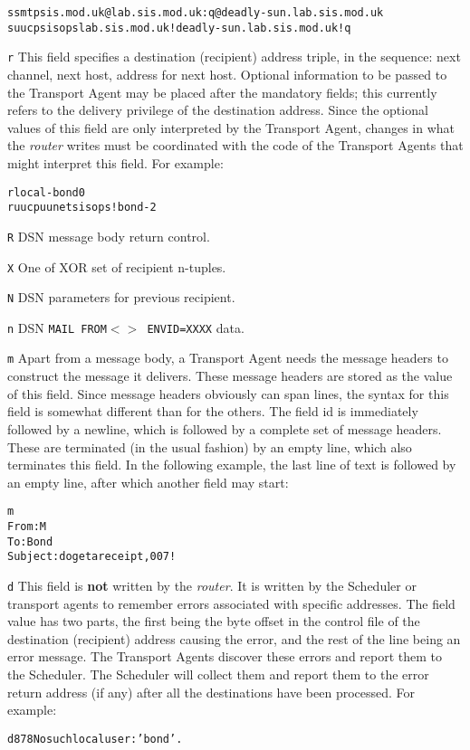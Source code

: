 \begin{alltt}
          s smtp sis.mod.uk @lab.sis.mod.uk:q@deadly-sun.lab.sis.mod.uk
          s uucp sisops lab.sis.mod.uk!deadly-sun.lab.sis.mod.uk!q
\end{alltt}


{\tt r}     
This field specifies a destination (recipient) address triple, in the
sequence: next channel, next host, address for next host.  Optional
information to be passed to the Transport Agent may be placed after the
mandatory fields; this currently refers to the delivery privilege of the
destination address.  Since the optional values of this field are only
interpreted by the Transport Agent, changes in what the {\em router} writes
must be coordinated with the code of the Transport Agents that might
interpret this field.  For example:

\begin{alltt}
          r local - bond 0
          r uucp uunet sisops!bond -2
\end{alltt}


{\tt R}
DSN message body return control.

{\tt X}
One of XOR set of recipient n-tuples.

{\tt N}
DSN parameters for previous recipient.

{\tt n}
DSN {\tt MAIL FROM{\(<>\)} ENVID=XXXX} data.

{\tt m}     
Apart from a message body, a Transport Agent needs the message headers
to construct the message it delivers.  These message headers are
stored as the value of this field.  Since message headers obviously
can span lines, the syntax for this field is somewhat different than
for the others.  The field id is immediately followed by a newline,
which is followed by a complete set of message headers.  These are
terminated (in the usual fashion) by an empty line, which also
terminates this field.  In the following example, the last line of
text is followed by an empty line, after which another field may
start:

\begin{alltt}
          m
          From: M
          To: Bond
          Subject: do get a receipt, 007!
\end{alltt}


{\tt d}     
This field is {\bf not} written by the {\em router}.  It is written by the
Scheduler or transport agents to remember errors associated with specific addresses. The
field value has two parts, the first being the byte offset in the
control file of the destination (recipient) address causing the error,
and the rest of the line being an error message.  The Transport Agents
discover these errors and report them to the Scheduler.  The Scheduler
will collect them and report them to the error return address (if any)
after all the destinations have been processed.
For example:
\begin{alltt}
          d 878 No such local user: 'bond'.
\end{alltt}
     

